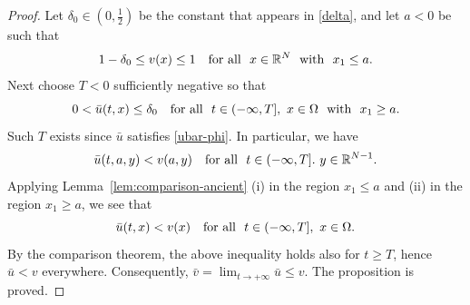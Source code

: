 \documentclass[a4paper,12pt,fullpage]{article}
\numberwithin{equation}{section}
\def\R{{\mathbb R}}
\begin{document}
\begin{proof}
Let $\delta_0\in(0,\frac12)$ be the constant that appears in \eqref{delta}, and let $a<0$ be such that
\[
1-\delta_0 \leq v(x) \leq 1 \quad \hbox{for all}\ \ x\in\R^N\ \ \hbox{with}\ \ x_1\leq a.
\]
Next choose $T<0$ sufficiently negative so that
\[
0<\bar{u}(t,x)\leq \delta_0 \quad \hbox{for all}\ \ t\in (-\infty,T],\ x\in\Omega \ \ \hbox{with}\ \ x_1\geq a.
\]
Such $T$ exists since $\bar{u}$ satisfies \eqref{ubar-phi}. In particular, we have
\[
\bar{u}(t,a,y)<v(a,y) \quad \hbox{for all}\ \ t\in (-\infty,T].\ y\in\R^{N-1}.
\]
Applying Lemma~\ref{lem:comparison-ancient} (i) in the region $x_1\leq a$ and (ii) in the region $x_1\geq a$, we see that 
\[
\bar{u}(t,x)<v(x)\quad\hbox{for all}\ \ t\in (-\infty,T],\ x\in\Omega.
\]
By the comparison theorem, the above inequality holds also for $t\geq T$, hence $\bar{u}<v$ everywhere. Consequently, $\bar{v}=\lim_{t\to+\infty}\bar{u}\leq v$. The proposition is proved.
\end{proof}
\end{document}
